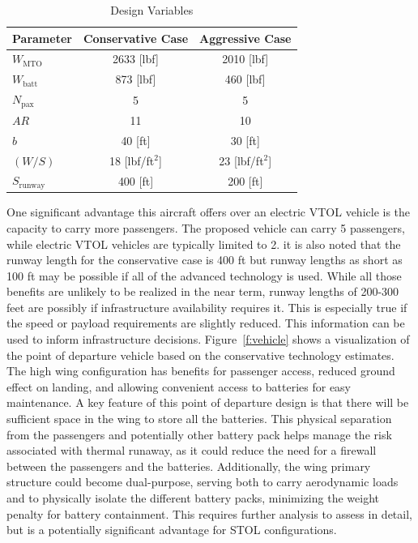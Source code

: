 \documentclass[]{aiaa-tc}%
\begin{document}
\begin{table}[H]
    \centering
    \caption{Design Variables}
    \label{t:pod}
    \begin{tabular}{l c c}
    \toprule
    \toprule
    Parameter                   & Conservative Case  & Aggressive Case \\ \hline
    $W_{\mathrm{MTO}}$          & 2633 [lbf]         & 2010 [lbf] \\
    $W_{\mathrm{batt}}$         & 873 [lbf]          & 460 [lbf] \\
    $N_{\mathrm{pax}}$          & 5                  & 5  \\
    $AR$                        & 11                 & 10 \\
    $b$                         & 40 [ft]            & 30 [ft] \\
    $(W/S)$                     & 18 [lbf/ft$^2$]    & 23 [lbf/ft$^2$] \\
    $S_{\mathrm{runway}}$       & 400 [ft]           & 200 [ft] \\
    \bottomrule
\end{tabular}
\end{table}

One significant advantage this aircraft offers over an electric VTOL vehicle is the capacity to carry more passengers.  The proposed vehicle can carry 5 passengers, while electric VTOL vehicles are typically limited to 2.  
it is also noted that the runway length for the conservative case is 400 ft but runway lengths as short as 100 ft may be possible if all  of the advanced technology is used.  While all those benefits are unlikely to be realized in the near term, runway lengths of 200-300 feet are possibly if infrastructure availability requires it.  This is especially true if the speed or payload requirements are slightly reduced.  
This information can be used to inform infrastructure decisions.  
Figure~\ref{f:vehicle} shows a visualization of the point of departure vehicle based on the conservative technology estimates.  The high wing configuration has benefits for passenger access, reduced ground effect on landing, and allowing convenient access to batteries for easy maintenance.  A key feature of this point of departure design is that there will be sufficient space in the wing to store all the batteries.  This physical separation from the passengers and potentially other battery pack helps manage the risk associated with thermal runaway, as it could reduce the need for a firewall between the passengers and the batteries.  Additionally, the wing primary structure could become dual-purpose, serving both to carry aerodynamic loads and to physically isolate the different battery packs, minimizing the weight penalty for battery containment.  This requires further analysis to assess in detail, but is a potentially significant advantage for STOL configurations.  
\end{document}
